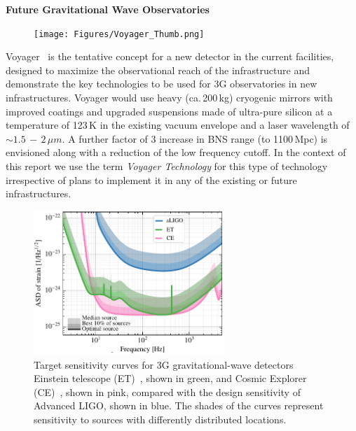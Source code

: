 \begin{DetBox}{\bf Future Gravitational Wave Observatories}
\begin{tcolorbox}[standard jigsaw,colframe=azure!70!black,colback=azure!20!white,opacityback=0.6,coltext=black, size=small, title=Voyager]
\begin{figure}
\vspace{-10pt}
\texttt{[image: Figures/Voyager\_Thumb.png]}
\label{fig:Voyager_Thumb}
\vspace{-20pt}
\end{figure}

Voyager~\cite{Voyager:Inst,VoyagerDCC2018, VoyagerDCC2019} is the tentative concept for a new detector in the current facilities, designed to maximize the observational reach of the infrastructure and demonstrate the key technologies to be used for 3G observatories in new infrastructures.
Voyager would use heavy (ca.\,200\,kg) cryogenic mirrors with improved coatings and upgraded suspensions made of ultra-pure silicon at a temperature of 123\,K in the existing vacuum envelope and a laser wavelength of $\sim1.5\,-\,2\,\mu m$. 
A further factor of 3 increase in BNS range (to 1100\,Mpc) is envisioned along with a reduction of the low frequency cutoff. %
In the context of this report we use the term \emph{Voyager Technology} for this type of technology irrespective of plans to implement it in any of the existing or future infrastructures.
\end{tcolorbox}

\end{DetBox}
\newpage 


\begin{figure}
\centering
\includegraphics*[width= 0.64\textwidth]{Figures/noises_percentiles-Voyager.pdf}
\caption{Target sensitivity curves for 3G gravitational-wave detectors Einstein telescope (ET)~\cite{ET2011}, shown in green, and Cosmic Explorer (CE)~\cite{CosmicExplorer2017}, shown in pink, compared with the design sensitivity of Advanced LIGO, shown in blue. 
The shades of the curves represent sensitivity to sources with differently distributed locations.}
\label{fig:3GSens}
\end{figure}

